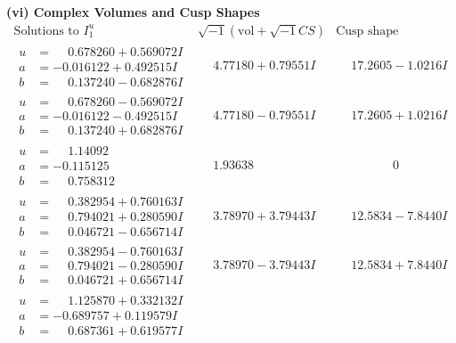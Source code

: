 \documentclass[1p]{elsarticle_modified}
\theoremstyle{definition}
\newcommand{\I}{\sqrt{-1}}
\begin{document}
\newpage\flushleft \textbf{(vi) Complex Volumes and Cusp Shapes}
$$\begin{array}{c|c|c}  
\text{Solutions to }I^u_{1}& \I (\text{vol} + \sqrt{-1}CS) & \text{Cusp shape}\\
 \hline 
\begin{aligned}
u &= \phantom{-}0.678260 + 0.569072 I \\
a &= -0.016122 + 0.492515 I \\
b &= \phantom{-}0.137240 - 0.682876 I\end{aligned}
 & \phantom{-}4.77180 + 0.79551 I & \phantom{-}17.2605 - 1.0216 I \\ \hline\begin{aligned}
u &= \phantom{-}0.678260 - 0.569072 I \\
a &= -0.016122 - 0.492515 I \\
b &= \phantom{-}0.137240 + 0.682876 I\end{aligned}
 & \phantom{-}4.77180 - 0.79551 I & \phantom{-}17.2605 + 1.0216 I \\ \hline\begin{aligned}
u &= \phantom{-}1.14092\phantom{ +0.000000I} \\
a &= -0.115125\phantom{ +0.000000I} \\
b &= \phantom{-}0.758312\phantom{ +0.000000I}\end{aligned}
 & \phantom{-}1.93638\phantom{ +0.000000I} & \phantom{-0.000000 } 0 \\ \hline\begin{aligned}
u &= \phantom{-}0.382954 + 0.760163 I \\
a &= \phantom{-}0.794021 + 0.280590 I \\
b &= \phantom{-}0.046721 - 0.656714 I\end{aligned}
 & \phantom{-}3.78970 + 3.79443 I & \phantom{-}12.5834 - 7.8440 I \\ \hline\begin{aligned}
u &= \phantom{-}0.382954 - 0.760163 I \\
a &= \phantom{-}0.794021 - 0.280590 I \\
b &= \phantom{-}0.046721 + 0.656714 I\end{aligned}
 & \phantom{-}3.78970 - 3.79443 I & \phantom{-}12.5834 + 7.8440 I \\ \hline\begin{aligned}
u &= \phantom{-}1.125870 + 0.332132 I \\
a &= -0.689757 + 0.119579 I \\
b &= \phantom{-}0.687361 + 0.619577 I\end{aligned}

\end{array}$$
\end{document}
